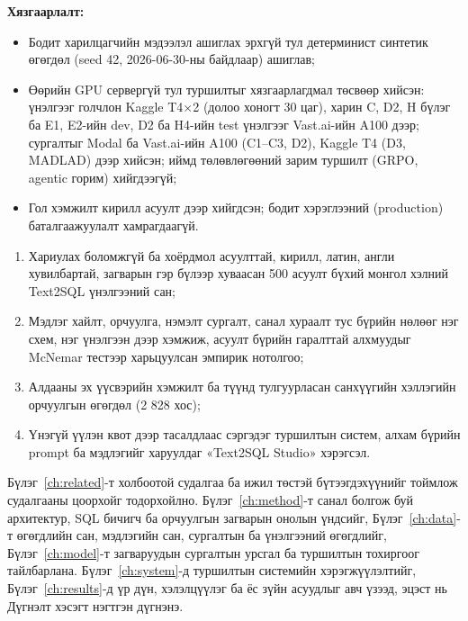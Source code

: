 \textbf{Хязгаарлалт:}
\begin{itemize}
  \item Бодит харилцагчийн мэдээлэл ашиглах эрхгүй тул детерминист синтетик өгөгдөл (seed 42, 2026-06-30-ны байдлаар) ашиглав;
  \item Өөрийн GPU сервергүй тул туршилтыг хязгаарлагдмал төсвөөр хийсэн: үнэлгээг голчлон Kaggle T4×2 (долоо хоногт 30
        цаг), харин C, D2, H бүлэг ба E1, E2-ийн dev, D2 ба H4-ийн test үнэлгээг Vast.ai-ийн A100 дээр; сургалтыг Modal ба
        Vast.ai-ийн A100 (C1--C3, D2), Kaggle T4 (D3, MADLAD) дээр хийсэн; иймд төлөвлөгөөний зарим туршилт (GRPO, agentic
        горим) хийгдээгүй;
  \item Гол хэмжилт кирилл асуулт дээр хийгдсэн; бодит хэрэглээний (production) баталгаажуулалт хамрагдаагүй.
\end{itemize}

\label{sec:contrib-intro}

\begin{enumerate}
  \item Хариулах боломжгүй ба хоёрдмол асуулттай, кирилл, латин, англи хувилбартай, загварын гэр бүлээр хуваасан 500
        асуулт бүхий монгол хэлний Text2SQL үнэлгээний сан;
  \item Мэдлэг хайлт, орчуулга, нэмэлт сургалт, санал хураалт тус бүрийн нөлөөг нэг схем, нэг үнэлгээн дээр хэмжиж,
        асуулт бүрийн гаралттай алхмуудыг McNemar тестээр харьцуулсан эмпирик нотолгоо;
  \item Алдааны эх үүсвэрийн хэмжилт ба түүнд тулгуурласан санхүүгийн хэллэгийн орчуулгын өгөгдөл (2 828 хос);
  \item Үнэгүй үүлэн квот дээр тасалдлаас сэргэдэг туршилтын систем, алхам бүрийн prompt ба мэдлэгийг харуулдаг
        «Text2SQL Studio» хэрэгсэл.
\end{enumerate}

\label{sec:structure}

Бүлэг~\ref{ch:related}-т холбоотой судалгаа ба ижил төстэй бүтээгдэхүүнийг тоймлож судалгааны цоорхойг тодорхойлно.
Бүлэг~\ref{ch:method}-т санал болгож буй архитектур, SQL бичигч ба орчуулгын загварын онолын үндсийг, Бүлэг~\ref{ch:data}-т
өгөгдлийн сан, мэдлэгийн сан, сургалтын ба үнэлгээний өгөгдлийг, Бүлэг~\ref{ch:model}-т загваруудын сургалтын урсгал ба
туршилтын тохиргоог тайлбарлана. Бүлэг~\ref{ch:system}-д туршилтын системийн хэрэгжүүлэлтийг, Бүлэг~\ref{ch:results}-д үр
дүн, хэлэлцүүлэг ба ёс зүйн асуудлыг авч үзээд, эцэст нь Дүгнэлт хэсэгт нэгтгэн дүгнэнэ.

\myformat
